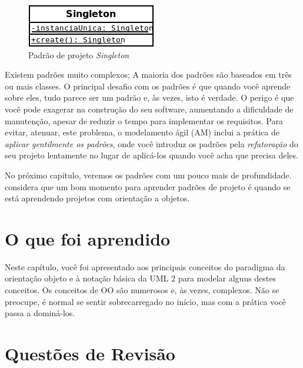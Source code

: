 \begin{figure}
\begin{center}
\includegraphics[scale=0.7]{singleton.png}
\end{center}
\caption{Padrão de projeto \emph{Singleton}} \label{fig:singleton}
\end{figure}

Existem padrões muito complexos; A maioria dos padrões são baseados em três ou mais classes. O principal desafio com os padrões é que quando você aprende sobre eles, tudo parece ser um padrão e, às vezes, isto é verdade. O perigo é que você pode exagerar na construção do seu software, aumentando a dificuldade de manutenção, apesar de reduzir o tempo para implementar os requisitos. Para evitar, atenuar, este problema, o modelamento ágil (AM) inclui a prática de \emph{aplicar gentilmente os padrões}, onde você introduz os padrões pela \emph{refatoração} do seu projeto lentamente no lugar de aplicá-los quando você acha que precisa deles.

No próximo capítulo, veremos os padrões com um pouco mais de profundidade.  considera que um bom momento para aprender padrões de projeto é quando se está aprendendo projetos com orientação a objetos.

\section{O que foi aprendido}

Neste capítulo, você foi apresentado aos principais conceitos do paradigma da orientação objeto e à notação básica da UML 2 para modelar alguns destes conceitos. Os conceitos de OO são numerosos e, às vezes, complexos. Não se preocupe, é normal se sentir sobrecarregado no início, mas com a prática você passa a dominá-los. 

\section{Questões de Revisão}

